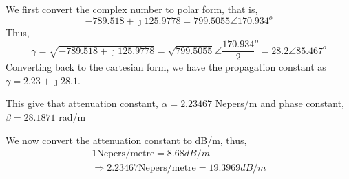 \begin{exmp}
We first convert the complex number to polar form, that is,
\begin{equation*}
-789.518 + \jmath 125.9778 = 799.5055\angle 170.934^o
\end{equation*}
Thus,
\begin{dmath*}
\gamma = \sqrt{-789.518 + \jmath 125.9778}
= \sqrt{799.5055}\angle {\frac{170.934}{2}}^o
=28.2\angle 85.467^o
\end{dmath*}
Converting back to the cartesian form, we have the propagation constant as $\gamma=2.23 +\jmath 28.1$.

This give that attenuation constant, $\alpha = 2.23467 $ Nepers/m and phase constant, $ \beta = 28.1871 $ rad/m

We now convert the attenuation constant to dB/m, thus,
\begin{align*}
1 \text{Nepers/metre} = 8.68dB/m\\
\Rightarrow 2.23467 \text{Nepers/metre} = 19.3969 dB/m
\end{align*}
\end{exmp} 

